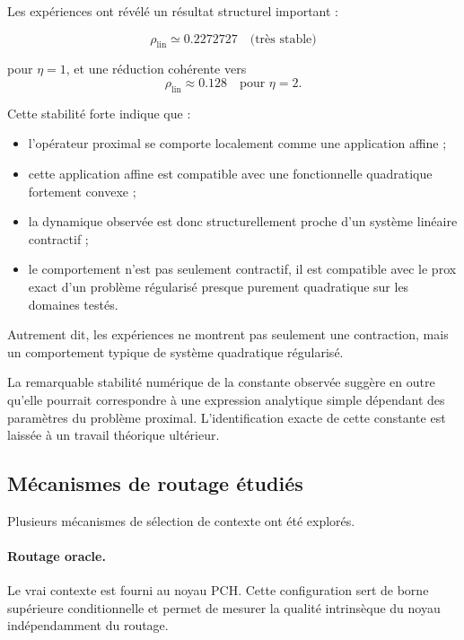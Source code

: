 \documentclass[11pt,a4paper]{article}
\newcommand{\1}{\mathbf 1}
\begin{document}
Les expériences ont révélé un résultat structurel important :

\[
\rho_{\mathrm{lin}} \simeq 0.2272727
\quad \text{(très stable)}
\]

pour \(\eta=1\), et une réduction cohérente vers
\[
\rho_{\mathrm{lin}} \approx 0.128
\quad \text{pour } \eta=2.
\]

Cette stabilité forte indique que :

\begin{itemize}[leftmargin=2em]
\item l’opérateur proximal se comporte localement comme une application affine ;
\item cette application affine est compatible avec une fonctionnelle quadratique fortement convexe ;
\item la dynamique observée est donc structurellement proche d’un système linéaire contractif ;
\item le comportement n’est pas seulement contractif, il est compatible avec le prox exact d’un problème régularisé presque purement quadratique sur les domaines testés.
\end{itemize}

Autrement dit, les expériences ne montrent pas seulement une contraction, mais un comportement typique de système quadratique régularisé.

La remarquable stabilité numérique de la constante observée suggère en outre qu’elle pourrait correspondre à une expression analytique simple dépendant des paramètres du problème proximal. L’identification exacte de cette constante est laissée à un travail théorique ultérieur.

\subsection{Mécanismes de routage étudiés}

Plusieurs mécanismes de sélection de contexte ont été explorés.

\paragraph{Routage oracle.}
Le vrai contexte est fourni au noyau PCH. Cette configuration sert de borne supérieure conditionnelle et permet de mesurer la qualité intrinsèque du noyau indépendamment du routage.
\end{document}
